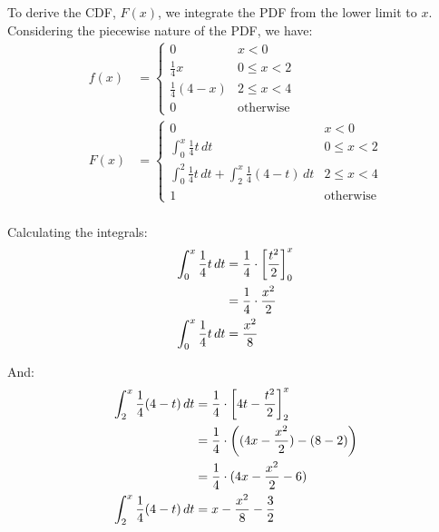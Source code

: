 \documentclass[a4paper, 10pt]{article}
\begin{document}
\begin{solution}
	To derive the CDF, \( F(x) \), we integrate the PDF from the lower limit to \( x \). \\
	Considering the piecewise nature of the PDF, we have:
	\begin{align*}
		f(x) & = \begin{cases}
			         0                  & x < 0            \\
			         \frac{1}{4}x       & 0 \leq x < 2     \\
			         \frac{1}{4}(4 - x) & 2 \leq x < 4     \\
			         0                  & \text{otherwise}
		         \end{cases}                                                  \\
		F(x) & = \begin{cases}
			         0                                                                   & x < 0            \\
			         \int_{0}^{x} \frac{1}{4}t\,dt                                       & 0 \leq x < 2     \\
			         \int_{0}^{2} \frac{1}{4}t\,dt + \int_{2}^{x} \frac{1}{4}(4 - t)\,dt & 2 \leq x < 4     \\
			         1                                                                   & \text{otherwise}
		         \end{cases} \\
	\end{align*}

	Calculating the integrals:
	\begin{align*}
		\int_{0}^{x} \frac{1}{4}t\,dt & = \frac{1}{4} \cdot \left[\frac{t^2}{2}\right]_{0}^{x} \\
		                              & = \frac{1}{4} \cdot \frac{x^2}{2}                     \\
		\int_{0}^{x} \frac{1}{4}t\,dt & = \frac{x^2}{8}
	\end{align*}

	And:
	\begin{align*}
		\int_{2}^{x} \frac{1}{4}(4 - t)\,dt & = \frac{1}{4} \cdot \left[4t - \frac{t^2}{2}\right]_{2}^{x} \\
		                                    & = \frac{1}{4} \cdot \left((4x - \frac{x^2}{2}) - (8 - 2)\right) \\
		                                    & = \frac{1}{4} \cdot (4x - \frac{x^2}{2} - 6)               \\
		\int_{2}^{x} \frac{1}{4}(4 - t)\,dt & = x - \frac{x^2}{8} - \frac{3}{2}
	\end{align*}


\end{solution}
\end{document}
